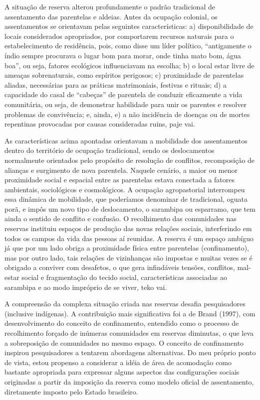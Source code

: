 \documentclass{article}
\begin{document}
A situa\c{c}\~ao de reserva alterou profundamente o padr\~ao tradicional
de assentamento das parentelas e aldeias. Antes da ocupa\c{c}\~ao
colonial, os assentamentos se orientavam pelas seguintes
caracter\'isticas: a) disponibilidade de locais considerados
apropriados, por comportarem recursos naturais para o estabelecimento
de resid\^encia, pois, como disse um l\'ider pol\'itico,
{\textquotedblleft}antigamente o \'indio sempre procurava o lugar bom
para morar, onde tinha mato bom, \'agua boa{\textquotedblright}, ou
seja, fatores ecol\'ogicos influenciavam na escolha; b) o local estar
livre de amea\c{c}as sobrenaturais, como esp\'iritos perigosos; c)
proximidade de parentelas aliadas, necess\'arias para as pr\'aticas
matrimoniais, festivas e rituais; d) a capacidade do casal de
{\textquotedblleft}cabe\c{c}as{\textquotedblright} de parentela de
conduzir eficazmente a vida comunit\'aria, ou seja, de demonstrar
habilidade para unir os parentes e resolver problemas de conviv\^encia;
e, ainda, e) a n\~ao incid\^encia de doen\c{c}as ou de mortes
repentinas provocadas por causas consideradas ruins, paje vai.

As caracter\'isticas acima apontadas orientavam a mobilidade dos
assentamentos dentro do territ\'orio de ocupa\c{c}\~ao tradicional,
sendo os deslocamentos normalmente orientados pelo prop\'osito de
resolu\c{c}\~ao de conflitos, recomposi\c{c}\~ao de alian\c{c}as e
surgimento de nova parentela. Naquele cen\'ario, a maior ou menor
proximidade social e espacial entre as parentelas estava conectada a
fatores ambientais, sociol\'ogicos e cosmol\'ogicos. A ocupa\c{c}\~ao
agropastorial interrompeu essa din\^amica de mobilidade, que
poder\'iamos denominar de tradicional, oguata por\~a, e imp\^os um novo
tipo de deslocamento, o sarambipa ou esparramo, que tem ainda o sentido
de conflito e confus\~ao. O recolhimento das comunidades nas reservas
instituiu espa\c{c}os de produ\c{c}\~ao das novas rela\c{c}\~oes
sociais, interferindo em todos os campos da vida das pessoas a\'i
reunidas. A reserva \'e um espa\c{c}o amb\'iguo j\'a que por um lado
obriga a proximidade f\'isica entre parentelas (confinamento), mas por
outro lado, tais rela\c{c}\~oes de vizinhan\c{c}as s\~ao impostas e
muitas vezes se \'e obrigado a conviver com desafetos, o que gera
infind\'aveis tens\~oes, conflitos, mal-estar social e
fragmenta\c{c}\~ao do tecido social, caracter\'isticas associadas ao
sarambipa e ao modo impr\'oprio de se viver, teko vai.

A compreens\~ao da complexa situa\c{c}\~ao criada nas reservas desafia
pesquisadores (inclusive ind\'igenas). A contribui\c{c}\~ao mais
significativa foi a de Brand (1997), com desenvolvimento do conceito de
confinamento, entendido como o processo de recolhimento for\c{c}ado de
in\'umeras comunidades em reservas diminutas, o que leva a
sobreposi\c{c}\~ao de comunidades no mesmo espa\c{c}o. O conceito de
confinamento inspirou pesquisadores a tentarem abordagens alternativas.
Do meu pr\'oprio ponto de vista, estou propenso a considerar a id\'eia
de \'area de acomoda\c{c}\~ao como bastante apropriada para expressar
alguns aspectos das configura\c{c}\~oes sociais originadas a partir da
imposi\c{c}\~ao da reserva como modelo oficial de assentamento,
diretamente imposto pelo Estado brasileiro. 
\end{document}

